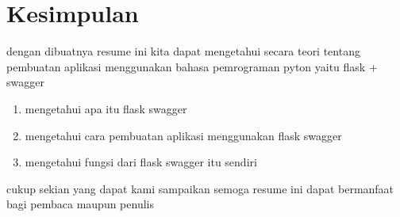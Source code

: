 \documentclass[12pt]{article}
\begin{document}
\section{Kesimpulan}
dengan dibuatnya resume ini kita dapat mengetahui secara teori tentang pembuatan aplikasi menggunakan bahasa pemrograman pyton yaitu flask + swagger 
\begin{enumerate}
\item mengetahui apa itu flask swagger
\item mengetahui cara pembuatan aplikasi menggunakan flask swagger
\item mengetahui fungsi dari flask swagger itu sendiri
\end{enumerate}	
cukup sekian yang dapat kami sampaikan semoga resume ini dapat bermanfaat  bagi pembaca maupun penulis 
\end{document}
